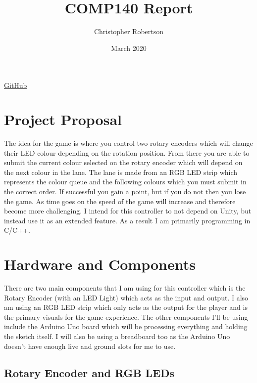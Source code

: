 \documentclass{article}
\title{COMP140 Report}
\author{Christopher Robertson}
\date{March 2020}
\begin{document}
\maketitle
\begin{center}
    \href{https://github.com/Koltonix/comp140-arduino-controller}{GitHub}
\end{center}
\newpage

\section{Project Proposal}

The idea for the game is where you control two rotary encoders which will change their LED colour depending on the rotation position. From there you are able to submit the current colour selected on the rotary encoder which will depend on the next colour in the lane. The lane is made from an RGB LED strip which represents the colour queue and the following colours which you must submit in the correct order. If successful you gain a point, but if you do not then you lose the game. As time goes on the speed of the game will increase and therefore become more challenging. I intend for this controller to not depend on Unity, but instead use it as an extended feature. As a result I am primarily programming in C/C++.

\section{Hardware and Components}

There are two main components that I am using for this controller which is the Rotary Encoder (with an LED Light) which acts as the input and output. I also am using an RGB LED strip which only acts as the output for the player and is the primary visuals for the game experience. The other components I'll be using include the Arduino Uno board which will be processing everything and holding the sketch itself. I will also be using a breadboard too as the Arduino Uno doesn't have enough live and ground slots for me to use.

\subsection{Rotary Encoder and RGB LEDs}
\end{document}
